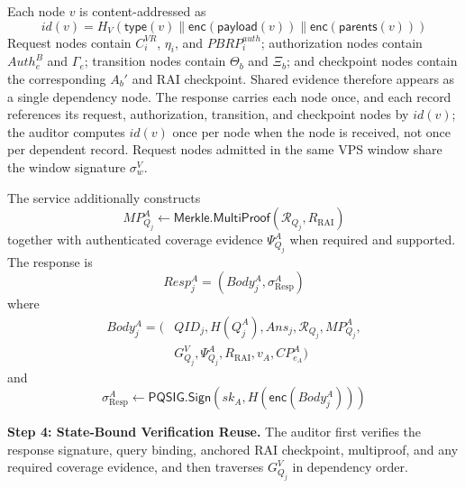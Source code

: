 \documentclass[lettersize,journal]{IEEEtran}
\begin{document}
Each node $v$ is content-addressed as
\begin{equation}
id(v)=
H_V(
\mathsf{type}(v)\parallel
\mathsf{enc}(\mathsf{payload}(v))\parallel
\mathsf{enc}(\mathsf{parents}(v)))
\label{eq:node_id}
\end{equation}
Request nodes contain $C_i^{VR}$, $\eta_i$, and
$PBRP_i^{auth}$; authorization nodes contain $Auth_e^B$ and
$\Gamma_e$; transition nodes contain $\Theta_b$ and $\Xi_b$; and
checkpoint nodes contain the corresponding $A_b'$ and RAI checkpoint.
Shared evidence therefore appears as a single dependency node.
The response carries each node once, and each record
references its request, authorization, transition, and checkpoint nodes
by $id(v)$; the auditor computes $id(v)$ once per node when the node is
received, not once per dependent record. Request nodes admitted in the
same VPS window share the window signature $\sigma_w^{V}$.

The service additionally constructs
\begin{equation}
MP_{Q_j}^A
\leftarrow
\mathsf{Merkle.MultiProof}
(\mathcal{R}_{Q_j},R_{\mathrm{RAI}})
\end{equation}
together with authenticated coverage evidence $\Psi_{Q_j}^A$ when
required and supported. The response is
\begin{equation}
Resp_j^A=(Body_j^A,\sigma_{\mathrm{Resp}}^A)
\end{equation}
where
\begin{equation}
\begin{aligned}
Body_j^A=\big(
&QID_j,H(Q_j^A),Ans_j,\mathcal{R}_{Q_j},MP_{Q_j}^A,\\
&G_{Q_j}^{V},\Psi_{Q_j}^{A},
R_{\mathrm{RAI}},v_A,CP_{e_A}^A\big)
\end{aligned}
\end{equation}
and
\begin{equation}
\sigma_{\mathrm{Resp}}^A
\leftarrow
\mathsf{PQSIG.Sign}
(sk_A,H(\mathsf{enc}(Body_j^A)))
\end{equation}

\medskip
\noindent\textbf{Step 4: State-Bound Verification Reuse.}
The auditor first verifies the response signature, query binding,
anchored RAI checkpoint, multiproof, and any required coverage
evidence, and then traverses $G_{Q_j}^{V}$ in dependency order.
\end{document}
